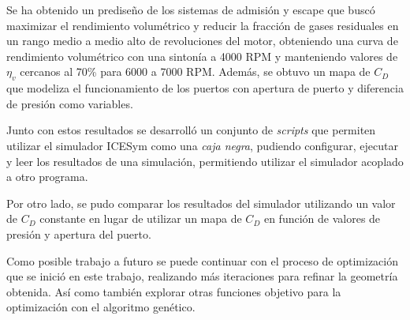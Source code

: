 Se ha obtenido un prediseño de los sistemas de admisión y escape que buscó
maximizar el rendimiento volumétrico y reducir la fracción de gases residuales
en un rango medio a medio alto de revoluciones del motor, obteniendo una curva
de rendimiento volumétrico con una sintonía a 4000 RPM y manteniendo valores de
$\eta_v$ cercanos al 70\% para 6000 a 7000 RPM.
%
Además, se obtuvo un mapa de $C_D$ que modeliza el funcionamiento de los
puertos con apertura de puerto y diferencia de presión como variables.

Junto con estos resultados se desarrolló un conjunto de \emph{scripts} que
permiten utilizar el simulador ICESym como una \emph{caja negra}, pudiendo
configurar, ejecutar y leer los resultados de una simulación, permitiendo
utilizar el simulador acoplado a otro programa.

Por otro lado, se pudo comparar los resultados del simulador utilizando un valor
de $C_{D}$ constante en lugar de utilizar un mapa de $C_{D}$ en función de
valores de presión y apertura del puerto.

Como posible trabajo a futuro se puede continuar con el proceso de optimización
que se inició en este trabajo, realizando más iteraciones para refinar la
geometría obtenida.
%
Así como también explorar otras funciones objetivo para la optimización con el
algoritmo genético.
